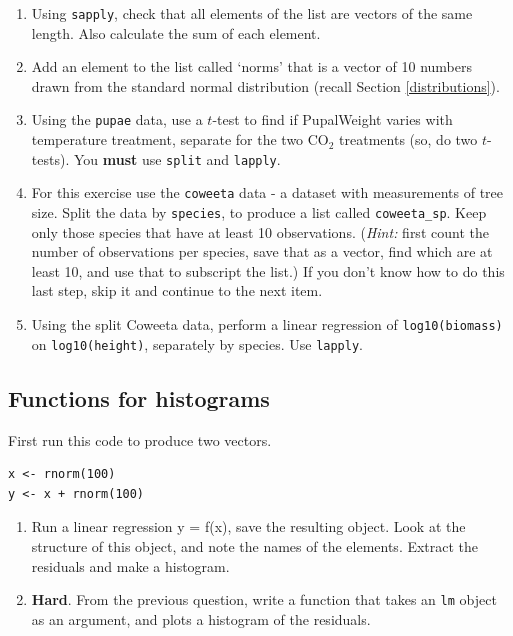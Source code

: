 \documentclass[]{book}
\begin{document}
\begin{enumerate}
\def\labelenumi{\arabic{enumi}.}
\item
  Using \texttt{sapply}, check that all elements of the list are vectors of the same length. Also calculate the sum of each element.
\item
  Add an element to the list called `norms' that is a vector of 10 numbers drawn from the standard normal distribution (recall Section \ref{distributions}).
\item
  Using the \texttt{pupae} data, use a \(t\)-test to find if PupalWeight varies with temperature treatment, separate for the two CO\(_2\) treatments (so, do two \(t\)-tests). You \textbf{must} use \texttt{split} and \texttt{lapply}.
\item
  For this exercise use the \texttt{coweeta} data - a dataset with measurements of tree size. Split the data by \texttt{species}, to produce a list called \texttt{coweeta\_sp}. Keep only those species that have at least 10 observations. (\emph{Hint:} first count the number of observations per species, save that as a vector, find which are at least 10, and use that to subscript the list.) If you don't know how to do this last step, skip it and continue to the next item.
\item
  Using the split Coweeta data, perform a linear regression of \texttt{log10(biomass)} on \texttt{log10(height)}, separately by species. Use \texttt{lapply}.
\end{enumerate}

\hypertarget{functions-for-histograms}{%
\subsection{Functions for histograms}\label{functions-for-histograms}}

First run this code to produce two vectors.

\begin{verbatim}
x <- rnorm(100)
y <- x + rnorm(100)
\end{verbatim}

\begin{enumerate}
\def\labelenumi{\arabic{enumi}.}
\item
  Run a linear regression y = f(x), save the resulting object. Look at the structure of this object, and note the names of the elements. Extract the residuals and make a histogram.
\item
  \textbf{Hard}. From the previous question, write a function that takes an \texttt{lm} object as an argument, and plots a histogram of the residuals.
\end{enumerate}
\end{document}

